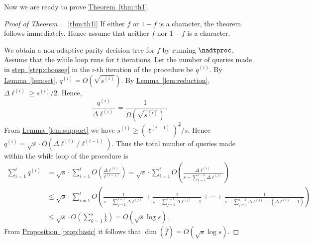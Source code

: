 \documentclass{toc}
\DeclareMathOperator{\dimn}{dim}
\newcommand{\lref}[2][]{\hyperref[#2]{#1~\ref*{#2}}}
\begin{document}
Now we are ready to prove \lref[Theorem]{thm:th1}.
\begin{proof}[Proof of Theorem \lref{thm:th1}]
If either $f$ or $1-f$ is a character, the theorem follows immediately. Hence assume that neither $f$ nor $1-f$ is a character.

We obtain a non-adaptive parity decision tree for $f$ by running $\nadtproc$. Assume that the while loop runs for $t$ iterations.
Let the number of queries made in \lref[step]{step:chooseg} in the $i$-th iteration
of the procedure be $q^{(i)}$. By \lref[Lemma]{lem:set}, $q^{(i)} = O(\sqrt {s^{(i)}})$. By \lref[Lemma]{lem:reduction}, $\Delta \ell^{(i)} \geq {s^{(i)}}/{2}$.
Hence,
\[
  \frac {q^{(i)}}{\Delta \ell^{(i)}}=\frac{1}{\Omega(\sqrt{s^{(i)}})}.
\]
{}From \lref[Lemma]{lem:support} we have
$s^{(i)} \geq \left(\ell^{(i-1)}\right)^2/s$. Hence
$q^{(i)}=\sqrt{s} \cdot O\left(\Delta \ell^{(i)}/\ell^{(i-1)}
\right)$. Thus the total number of queries made within the while loop
of the procedure is
\begin{align}
\label{count}
 \displaystyle\sum_{i=1}^t q^{(i)} &= \sqrt{s} \cdot \displaystyle\sum_{i=1}^t O\left(\frac{\Delta \ell^{(i)}}{\ell^{(i-1)}}\right) \nonumber 
                                           = \sqrt{s} \cdot \displaystyle\sum_{i=1}^t O\left(\frac{\Delta \ell^{(i)}}{s - \displaystyle\sum_{j=1}^{i-1} \Delta \ell^{(j)}}\right) \nonumber \\
					  & \leq \sqrt{s} \cdot \displaystyle\sum_{i=1}^t O \left(  \frac{1}{s - \displaystyle\sum_{j=1}^{i-1} \Delta \ell^{(j)}} + \frac{1}{s - \displaystyle\sum_{j=1}^{i-1} \Delta \ell^{(j)}-1} 
+\cdots+  \frac{1}{s - \displaystyle\sum_{j=1}^{i-1} \Delta \ell^{(j)}-(\Delta \ell^{(i)}-1)} \right) \nonumber \\
					  &\leq \sqrt{s} \cdot \displaystyle O\left(\sum_{k=1}^s \frac{1}{k}\right) = O(\sqrt{s} \log s). \nonumber
\end{align}
{}From \lref[Proposition]{prop:basic} it follows that
$\dimn(\widehat{f}) = O(\sqrt{s} \log s)$.
\end{proof}
\end{document}
